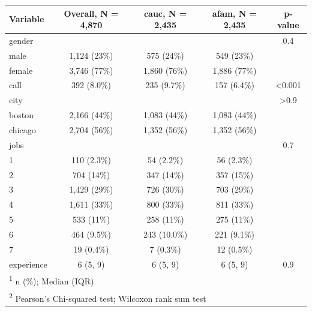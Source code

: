 \documentclass[
  11pt,
]{book}
\numberwithin{equation}{section}
\numberwithin{countremarque}{section}
\begin{document}
\begin{longtable}{lcccc}
\toprule
\textbf{Variable} & \textbf{Overall}, N = 4,870 & \textbf{cauc}, N = 2,435 & \textbf{afam}, N = 2,435 & \textbf{p-value}\\
\midrule
gender &  &  &  & 0.4\\
\hspace{1em}male & 1,124 (23\%) & 575 (24\%) & 549 (23\%) & \\
\hspace{1em}female & 3,746 (77\%) & 1,860 (76\%) & 1,886 (77\%) & \\
call & 392 (8.0\%) & 235 (9.7\%) & 157 (6.4\%) & <0.001\\
city &  &  &  & >0.9\\
\addlinespace
\hspace{1em}boston & 2,166 (44\%) & 1,083 (44\%) & 1,083 (44\%) & \\
\hspace{1em}chicago & 2,704 (56\%) & 1,352 (56\%) & 1,352 (56\%) & \\
jobs &  &  &  & 0.7\\
\hspace{1em}1 & 110 (2.3\%) & 54 (2.2\%) & 56 (2.3\%) & \\
\hspace{1em}2 & 704 (14\%) & 347 (14\%) & 357 (15\%) & \\
\addlinespace
\hspace{1em}3 & 1,429 (29\%) & 726 (30\%) & 703 (29\%) & \\
\hspace{1em}4 & 1,611 (33\%) & 800 (33\%) & 811 (33\%) & \\
\hspace{1em}5 & 533 (11\%) & 258 (11\%) & 275 (11\%) & \\
\hspace{1em}6 & 464 (9.5\%) & 243 (10.0\%) & 221 (9.1\%) & \\
\hspace{1em}7 & 19 (0.4\%) & 7 (0.3\%) & 12 (0.5\%) & \\
\addlinespace
experience & 6 (5, 9) & 6 (5, 9) & 6 (5, 9) & 0.9\\
\bottomrule
\multicolumn{5}{l}{\rule{0pt}{1em}\textsuperscript{1} n (\%); Median (IQR)}\\
\multicolumn{5}{l}{\rule{0pt}{1em}\textsuperscript{2} Pearson's Chi-squared test; Wilcoxon rank sum test}\\
\end{longtable}
\end{document}
